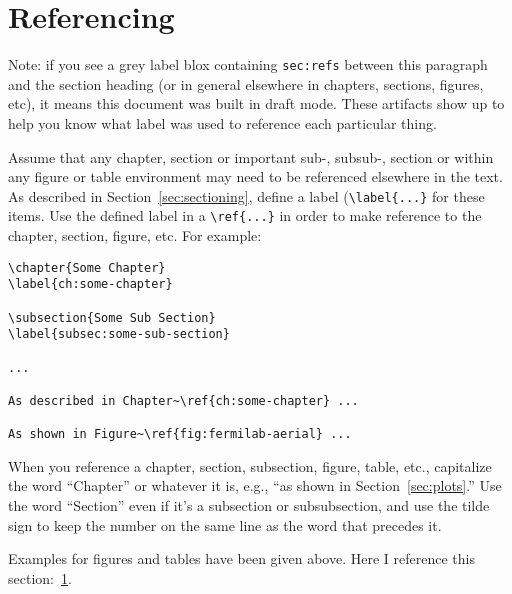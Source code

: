 \FloatBarrier
\section{Referencing}
\label{sec:refs}

Note: if you see a grey label blox containing \texttt{sec:refs}
between this paragraph and the section heading (or in general
elsewhere in chapters, sections, figures, etc), it means this document
was built in draft mode.  
These artifacts show up to help you know what label was used to
reference each particular thing.

Assume that any chapter, section or important sub-, subsub-, section
or within any figure or table environment may need to be referenced
elsewhere in the text. As described in Section~\ref{sec:sectioning},
define a label (\verb|\label{...}| for these items.
Use the defined label in a \verb|\ref{...}| in order to make reference
to the chapter, section, figure, etc.
For example:

\begin{verbatim}
\chapter{Some Chapter}
\label{ch:some-chapter}

\subsection{Some Sub Section}
\label{subsec:some-sub-section}

...

As described in Chapter~\ref{ch:some-chapter} ...

As shown in Figure~\ref{fig:fermilab-aerial} ...
\end{verbatim}

When you reference a chapter, section, subsection, figure, table,
etc., capitalize the word ``Chapter'' or whatever it is, e.g., ``as
shown in Section~\ref{sec:plots}.''
Use the word ``Section'' even if it's a subsection or subsubsection,
and use the tilde sign to keep the number on the same line as the word
that precedes it.

Examples for figures and tables have been given above.  Here I
reference this section:~\ref{sec:refs}.  



